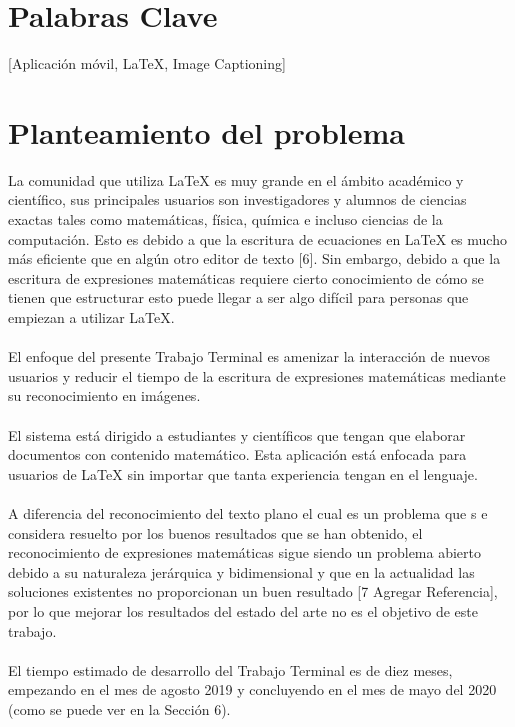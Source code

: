 \section{Palabras Clave}
[Aplicación móvil, LaTeX, Image Captioning] %
\section{Planteamiento del problema}


La comunidad que utiliza LaTeX es muy grande en el ámbito académico y científico, sus principales usuarios son investigadores y alumnos de ciencias exactas tales como matemáticas, física, química e incluso ciencias de la computación\cite{latexUsage}. Esto es debido a que la escritura de ecuaciones en LaTeX es mucho más eficiente que en algún otro editor de texto [6]. Sin embargo, debido a que la escritura de expresiones matemáticas requiere cierto conocimiento de cómo se tienen que estructurar esto puede llegar a ser algo difícil para personas que empiezan a utilizar LaTeX.
\\\\%
El enfoque del presente Trabajo Terminal es amenizar la interacción de nuevos usuarios y reducir el tiempo de la escritura de expresiones matemáticas mediante su reconocimiento en imágenes.
\\\\%
El sistema está dirigido a estudiantes y científicos que tengan que elaborar documentos con contenido matemático. Esta aplicación está enfocada para usuarios de LaTeX sin importar que tanta experiencia tengan en el lenguaje.
\\\\%
A diferencia del reconocimiento del texto plano el cual es un problema que s e considera resuelto por los buenos resultados que se han obtenido, el reconocimiento de expresiones matemáticas sigue siendo un problema abierto debido a su naturaleza jerárquica y bidimensional y que en la actualidad las soluciones existentes no proporcionan un buen resultado [7 Agregar Referencia], por lo que mejorar los resultados del estado del arte no es el objetivo de este trabajo.
\\\\%
El tiempo estimado de desarrollo del Trabajo Terminal es de diez meses, empezando en el mes de agosto 2019 y concluyendo en el mes de mayo del 2020 (como se puede ver en la Sección 6).%

